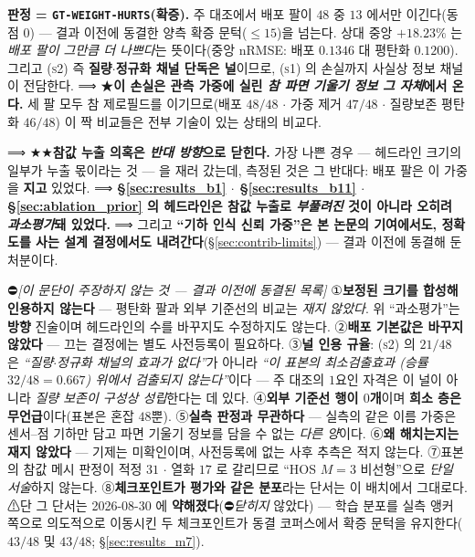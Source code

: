 \documentclass[11pt]{report}
\numberwithin{equation}{chapter}
\numberwithin{figure}{chapter}
\numberwithin{table}{chapter}
\begin{document}
\textbf{판정 = \texttt{GT-WEIGHT-HURTS}(확증).} 주 대조에서 배포 팔이 $48$ 중 $13$ 에서만
이긴다(동점 $0$) --- 결과 이전에 동결한 양측 확증 문턱($\le 15$)을 넘는다. 상대 중앙
$+18.23\%$ 는 \emph{배포 팔이 그만큼 더 나쁘다}는 뜻이다(중앙 nRMSE: 배포 $0.1346$ 대
평탄화 $0.1200$). 그리고 \textsc{(s2)} 즉 \textbf{질량$\cdot$정규화 채널 단독은 널}이므로,
\textsc{(s1)} 의 손실까지 사실상 정보 채널이 전담한다.
⟹ ★\textbf{이 손실은 관측 가중에 실린 \emph{참 파면 기울기 정보 그 자체}에서 온다.}
세 팔 모두 참 제로필드를 이기므로(배포 $48/48$ $\cdot$ 가중 제거 $47/48$ $\cdot$
질량보존 평탄화 $46/48$) 이 짝 비교들은 전부 기술이 있는 상태의 비교다.

⟹ ★★\textbf{참값 누출 의혹은 \emph{반대 방향}으로 닫힌다.} 가장 나쁜 경우 --- 헤드라인
크기의 일부가 누출 몫이라는 것 --- 을 재러 갔는데, 측정된 것은 그 반대다: 배포 팔은
이 가중을 \textbf{지고} 있었다. ⟹ \textbf{\S\ref{sec:results_b1} $\cdot$
\S\ref{sec:results_b11} $\cdot$ \S\ref{sec:ablation_prior} 의 헤드라인은 참값 누출로
\emph{부풀려진} 것이 아니라 오히려 \emph{과소평가}돼 있었다.}
⟹ 그리고 \textbf{``기하 인식 신뢰 가중''은 본 논문의 기여에서도, 정확도를 사는 설계
결정에서도 내려간다}(\S\ref{sec:contrib-limits}) --- 결과 이전에 동결해 둔 처분이다.

⛔\emph{[이 문단이 주장하지 \emph{않는} 것 --- 결과 이전에 동결된 목록]}
①\textbf{보정된 크기를 합성해 인용하지 않는다} --- 평탄화 팔과 외부 기준선의 비교는
\emph{재지 않았다}. 위 ``과소평가''는 \textbf{방향} 진술이며 헤드라인의 수를 바꾸지도
수정하지도 않는다. ②\textbf{배포 기본값은 바꾸지 않았다} --- 끄는 결정에는 별도
사전등록이 필요하다. ③\textbf{널 인용 규율}: \textsc{(s2)} 의 $21/48$ 은
\emph{``질량$\cdot$정규화 채널의 효과가 없다''}가 아니라 \emph{``이 표본의 최소검출효과
(승률 $32/48 = 0.667$) 위에서 검출되지 않는다''}이다 --- 주 대조의 $1$요인 자격은 이
널이 아니라 \emph{질량 보존이 구성상 성립}한다는 데 있다. ④\textbf{외부 기준선 행이
$0$개}이며 \textbf{희소 층은 무언급}이다(표본은 혼잡 $48$뿐). ⑤\textbf{실측 판정과
무관하다} --- 실측의 같은 이름 가중은 센서--점 기하만 담고 파면 기울기 정보를 담을 수
없는 \emph{다른 양}이다. ⑥\textbf{왜 해치는지는 재지 않았다} --- 기제는 미확인이며,
사전등록에 없는 사후 추측은 적지 않는다. ⑦표본의 참값 메시 판정이 적정 $31$ $\cdot$
열화 $17$ 로 갈리므로 ``HOS $M{=}3$ 비선형''으로 \emph{단일 서술}하지 않는다.
⑧\textbf{체크포인트가 평가와 같은 분포}라는 단서는 이 배치에서 그대로다.
⚠단 그 단서는 2026-08-30 에 \textbf{약해졌다}(⛔\emph{닫히지} 않았다) --- 학습 분포를
실측 앵커 쪽으로 의도적으로 이동시킨 두 체크포인트가 동결 코퍼스에서 확증 문턱을
유지한다($43/48$ 및 $43/48$; \S\ref{sec:results_m7}).
\end{document}
